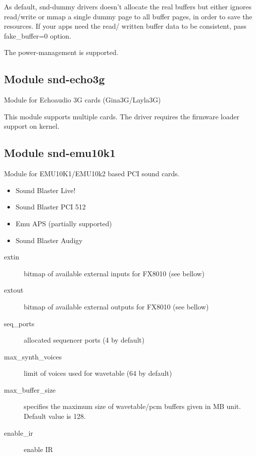 \documentclass[a4paper,8pt,english]{sphinxmanual}
\begin{document}
As default, snd-dummy drivers doesn't allocate the real buffers
but either ignores read/write or mmap a single dummy page to all
buffer pages, in order to save the resources.  If your apps need
the read/ written buffer data to be consistent, pass fake\_buffer=0
option.

The power-management is supported.


\subsection{Module snd-echo3g}
\label{sound/alsa-configuration:module-snd-echo3g}
Module for Echoaudio 3G cards (Gina3G/Layla3G)

This module supports multiple cards.
The driver requires the firmware loader support on kernel.


\subsection{Module snd-emu10k1}
\label{sound/alsa-configuration:module-snd-emu10k1}
Module for EMU10K1/EMU10k2 based PCI sound cards.
\begin{itemize}
\item {} 
Sound Blaster Live!

\item {} 
Sound Blaster PCI 512

\item {} 
Emu APS (partially supported)

\item {} 
Sound Blaster Audigy

\end{itemize}
\begin{description}
\item[{extin}] \leavevmode
bitmap of available external inputs for FX8010 (see bellow)

\item[{extout}] \leavevmode
bitmap of available external outputs for FX8010 (see bellow)

\item[{seq\_ports}] \leavevmode
allocated sequencer ports (4 by default)

\item[{max\_synth\_voices}] \leavevmode
limit of voices used for wavetable (64 by default)

\item[{max\_buffer\_size}] \leavevmode
specifies the maximum size of wavetable/pcm buffers given in MB
unit.  Default value is 128.

\item[{enable\_ir}] \leavevmode
enable IR

\end{description}
\end{document}
